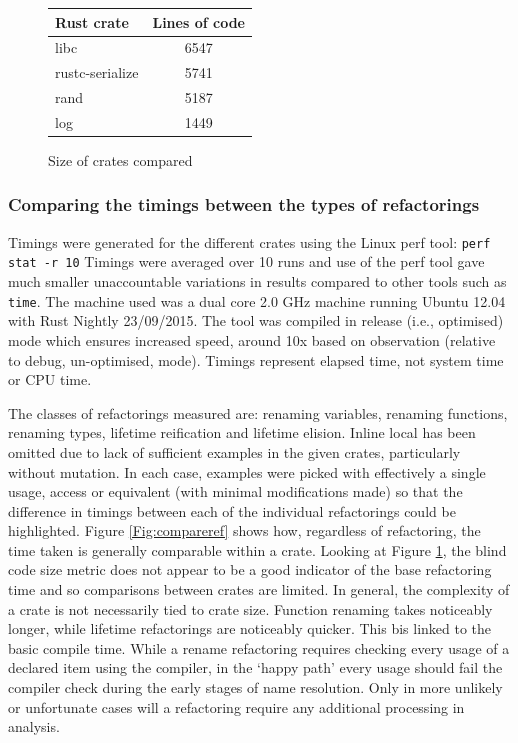 \begin{figure}[h]
\begin{center}
    \begin{tabular}{ | l | c |}
    \hline
    \textbf{Rust crate} & \textbf{Lines of code} \\ \hline
    libc & 6547 \\ \hline
    rustc-serialize &  5741 \\ \hline
    rand &   5187 \\ \hline
    log &  1449 \\ \hline
    \end{tabular}
\end{center}

\caption{Size of crates compared}
\label{Fig:codesize}
\end{figure}

\subsubsection{Comparing the timings between the types of refactorings}
Timings were generated for the different crates using the Linux perf tool: {\verb|perf stat -r 10|} Timings were averaged over 10 runs and use of the perf tool gave much smaller unaccountable variations in results compared to other tools such as {\verb|time|}. The machine used was a dual core 2.0 GHz machine running Ubuntu 12.04 with Rust Nightly 23/09/2015. The tool was compiled in release (i.e., optimised) mode which ensures increased speed, around 10x based on observation (relative to debug, un-optimised, mode). Timings represent elapsed time, not system time or CPU time.

The classes of refactorings measured are: renaming variables, renaming functions, renaming types, lifetime reification and lifetime elision. Inline local has been omitted due to lack of sufficient examples in the given crates, particularly without mutation. In each case, examples were picked with effectively a single usage, access or equivalent (with minimal modifications made) so that the difference in timings between each of the individual refactorings could be highlighted. Figure \ref{Fig:compareref} shows how, regardless of refactoring, the time taken is generally comparable within a crate. Looking at Figure \ref{Fig:codesize}, the blind code size metric does not appear to be a good indicator of the base refactoring time and so comparisons between crates are limited. In general, the complexity of a crate is not necessarily tied to crate size. Function renaming takes noticeably longer, while lifetime refactorings are noticeably quicker. This bis linked to the basic compile time. While a rename refactoring requires checking every usage of a declared item using the compiler, in the `happy path' every usage should fail the compiler check during the early stages of name resolution. Only in more unlikely or unfortunate cases will a refactoring require any additional processing in analysis.

